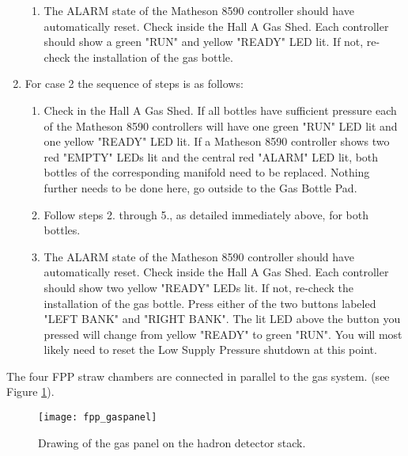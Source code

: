 \begin{enumerate}
\begin{enumerate}
    \item The ALARM state of the Matheson 8590 controller should have 
automatically reset. Check inside the Hall A Gas Shed. Each controller 
should show a green "RUN" and yellow "READY" LED lit. If not, 
re-check the installation of the gas bottle.
\end{enumerate}

\item For case 2 the sequence of steps is as follows:
\begin{enumerate}
    \item  Check in the Hall A Gas Shed. If all bottles have sufficient 
pressure each of the Matheson 8590 controllers will 
have one green "RUN" LED lit and one yellow "READY" LED lit. 
If a Matheson 8590 controller shows two red "EMPTY" LEDs lit and 
the central red "ALARM" LED lit, both bottles of the corresponding 
manifold need to be replaced. Nothing further 
needs to be done here, go outside to the Gas Bottle Pad. 

    \item Follow steps 2. through 5., as detailed immediately above, for 
both bottles.

    \item The ALARM state of the Matheson 8590 controller should have 
automatically reset. Check inside the Hall A Gas Shed. Each 
controller should show two yellow "READY" LEDs lit. If not, re-check 
the installation of the gas bottle. Press either of the two buttons 
labeled "LEFT BANK" and "RIGHT BANK". The lit LED above the button 
you pressed will change from yellow "READY" to green "RUN". You will 
most likely need to reset the Low Supply Pressure shutdown at this point.
\end{enumerate}
\end{enumerate}


The four FPP straw chambers are connected in parallel to the gas system.
(see Figure \ref{fig:gaspanel}).

\begin{figure}
\begin{center}
\texttt{[image: fpp\_gaspanel]}
{\linespread{1.}
\caption[Detectors: Hadron Arm Gas Panel]{Drawing of the gas panel on the hadron detector stack.}
\label{fig:gaspanel}}
\end{center}
\end{figure}


